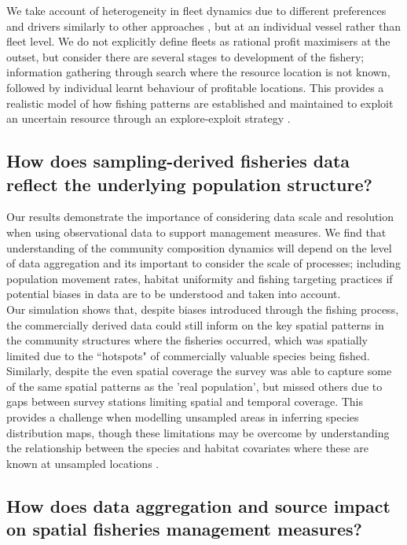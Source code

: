 \documentclass[review]{elsarticle}
\begin{document}
We take account of heterogeneity in fleet dynamics due to different preferences
and drivers similarly to other approaches \citep{Fulton2011}, but at an
individual vessel rather than fleet level. We do not explicitly define fleets
as rational profit maximisers at the outset, but consider there are several
stages to development of the fishery; information gathering through search
where the resource location is not known, followed by individual learnt
behaviour of profitable locations.  This provides a realistic model of how
fishing patterns are established and maintained to exploit an uncertain
resource through an explore-exploit strategy \citep{Mangel1983, Bailey2018}. 

\subsection{How does sampling-derived fisheries data reflect the underlying
	population structure?}


Our results demonstrate the importance of considering data scale and resolution
when using observational data to support management measures. We find that
understanding of the community composition dynamics will depend on the level of
data aggregation and its important to consider the scale of processes;
including population movement rates, habitat uniformity and fishing targeting
practices if potential biases in data are to be understood and taken into
account. \\

Our simulation shows that, despite biases introduced through the fishing
process, the commercially derived data could still inform on the key spatial
patterns in the community structures where the fisheries occurred, which was
spatially limited due to the ``hotspots" of commercially valuable species being
fished. Similarly, despite the even spatial coverage the survey was able to
capture some of the same spatial patterns as the 'real population', but missed
others due to gaps between survey stations limiting spatial and temporal
coverage. This provides a challenge when modelling unsampled areas in inferring
species distribution maps, though these limitations may be overcome by
understanding the relationship between the species and habitat covariates where
these are known at unsampled locations \citep{Robinson2011}. \\ 

\subsection{How does data aggregation and source impact on spatial fisheries
	management measures?}
\end{document}
